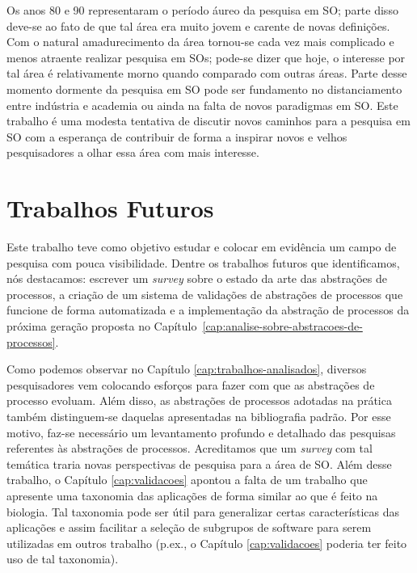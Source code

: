 Os anos 80 e 90 representaram o período áureo da pesquisa em SO; parte disso
deve-se ao fato de que tal área era muito jovem e carente de novas
definições. Com o natural amadurecimento da área tornou-se cada vez mais
complicado e menos atraente realizar pesquisa em SOs; pode-se dizer que hoje, o
interesse por tal área é relativamente morno quando comparado com outras áreas.
Parte desse momento dormente da pesquisa em SO pode ser fundamento no
distanciamento entre indústria e academia ou ainda na falta de novos
paradigmas em SO. Este trabalho é uma modesta tentativa de discutir
novos caminhos para a pesquisa em SO com a esperança de contribuir de forma a
inspirar novos e velhos pesquisadores a olhar essa área com mais interesse.

\section{Trabalhos Futuros}


Este trabalho teve como objetivo estudar e colocar em evidência um campo de
pesquisa com pouca visibilidade. Dentre os trabalhos futuros que identificamos,
nós destacamos: escrever um \textit{survey} sobre o estado da arte das
abstrações de processos, a criação de um sistema de validações de abstrações de
processos que funcione de forma automatizada e a implementação da abstração de
processos da próxima geração proposta no
Capítulo~\ref{cap:analise-sobre-abstracoes-de-processos}.

Como podemos observar no Capítulo \ref{cap:trabalhos-analisados}, diversos
pesquisadores vem colocando esforços para fazer com que as abstrações de
processo evoluam. Além disso, as abstrações de processos adotadas na prática
também distinguem-se daquelas apresentadas na bibliografia padrão. Por esse
motivo, faz-se necessário um levantamento profundo e detalhado das pesquisas
referentes às abstrações de processos. Acreditamos que um
\textit{survey} com tal temática traria novas perspectivas de pesquisa para a
área de SO. Além desse trabalho, o Capítulo \ref{cap:validacoes} apontou a
falta de um trabalho que apresente uma taxonomia das aplicações de forma
similar ao que é feito na biologia.  Tal taxonomia pode ser útil para
generalizar certas características das aplicações e assim facilitar a seleção
de subgrupos de software para serem utilizadas em outros trabalho (p.ex., o
Capítulo \ref{cap:validacoes} poderia ter feito uso de tal taxonomia).

